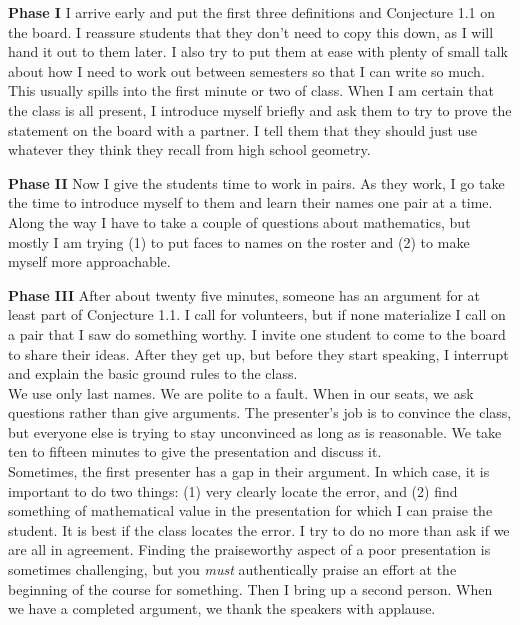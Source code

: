 \documentclass{tufte-handout}
\theoremstyle{definition}
\begin{document}
\begin{compactdesc}
\item[\textbf{Phase I}] I arrive early and put the first three definitions and Conjecture 1.1 on the board.
I reassure students that they don't need to copy this down, as I will hand it out to them later.
I also try to put them at ease with plenty of small talk about how I need to work out between semesters so that I can write so much.
This usually spills into the first minute or two of class.
When I am certain that the class is all present, I introduce myself briefly and ask them to try to prove the statement on the board with a partner.
I tell them that they should just use whatever they think they recall from high school geometry.\\[.1in]

\item[\textbf{Phase II}] Now I give the students time to work in pairs.
As they work, I go take the time to introduce myself to them and learn their names one pair at a time.
Along the way I have to take a couple of questions about mathematics, but mostly I am trying (1) to put faces to names on the roster and (2) to make myself more approachable.\\[.1in]

\item[\textbf{Phase III}] After about twenty five minutes, someone has an argument for at least part of Conjecture 1.1.
I call for volunteers, but if none materialize I call on a pair that I saw do something worthy.
I invite one student to come to the board to share their ideas.
After they get up, but before they start speaking, I interrupt and explain the basic ground rules to the class.\\[.1in]

We use only last names.
We are polite to a fault.
When in our seats, we ask questions rather than give arguments.
The presenter's job is to convince the class, but everyone else is trying to stay unconvinced as long as is reasonable.
We take ten to fifteen minutes to give the presentation and discuss it.\\[.1in]

Sometimes, the first presenter has a gap in their argument. 
In which case, it is important to do two things: (1) very clearly locate the error, and (2) find something of mathematical value in the presentation for which I can praise the student.
It is best if the class locates the error.
I try to do no more than ask if we are all in agreement.
Finding the praiseworthy aspect of a poor presentation is sometimes challenging, but you \emph{must} authentically praise an effort at the beginning of the course for something.
Then I bring up a second person.
When we have a completed argument, we thank the speakers with applause.\\[.1in]


\end{compactdesc}
\end{document}

